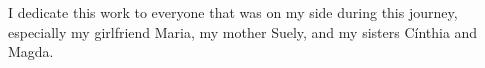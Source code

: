 I dedicate this work to everyone that was on my side during this journey, especially my girlfriend Maria, my mother Suely, and my sisters Cínthia and Magda.
